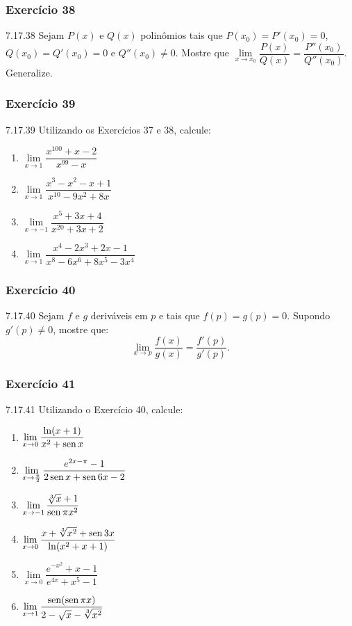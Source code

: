 \subsubsection*{Exercício 38}
\begin{exercicio}[38]{7.17.38}
Sejam $P(x)$ e $Q(x)$ polinômios tais que $P(x_0) = P'(x_0) = 0$, $Q(x_0) = Q'(x_0) = 0$ e $Q''(x_0) \neq 0$. Mostre que $\lim\limits_{x \to x_0} \dfrac{P(x)}{Q(x)} = \dfrac{P''(x_0)}{Q''(x_0)}$. Generalize.
\end{exercicio}

\subsubsection*{Exercício 39}
\begin{exercicio}[39]{7.17.39}
Utilizando os Exercícios 37 e 38, calcule:
\begin{enumerate}[label=\alph*)]
    \item $\lim\limits_{x \to 1} \dfrac{x^{100} + x - 2}{x^{99} - x}$
    \item $\lim\limits_{x \to 1} \dfrac{x^3 - x^2 - x + 1}{x^{10} - 9x^2 + 8x}$
    \item $\lim\limits_{x \to -1} \dfrac{x^5 + 3x + 4}{x^{20} + 3x + 2}$
    \item $\lim\limits_{x \to 1} \dfrac{x^4 - 2x^3 + 2x - 1}{x^8 - 6x^6 + 8x^5 - 3x^4}$
\end{enumerate}
\end{exercicio}

\subsubsection*{Exercício 40}
\begin{exercicio}[40]{7.17.40}
Sejam $f$ e $g$ deriváveis em $p$ e tais que $f(p) = g(p) = 0$. Supondo $g'(p) \neq 0$, mostre que:
\[
\lim_{x \to p} \dfrac{f(x)}{g(x)} = \dfrac{f'(p)}{g'(p)}.
\]
\end{exercicio}

\subsubsection*{Exercício 41}
\begin{exercicio}[41]{7.17.41}
Utilizando o Exercício 40, calcule:
\begin{enumerate}[label=\alph*)]
    \item $\lim\limits_{x \to 0} \dfrac{\ln(x + 1)}{x^2 + \operatorname{sen} x}$
    \item $\lim\limits_{x \to \frac{\pi}{2}} \dfrac{e^{2x - \pi} - 1}{2\operatorname{sen} x + \operatorname{sen} 6x - 2}$
    \item $\lim\limits_{x \to -1} \dfrac{\sqrt[3]{x} + 1}{\operatorname{sen}\pi x^2}$
    \item $\lim\limits_{x \to 0} \dfrac{x + \sqrt[3]{x^2} + \operatorname{sen} 3x}{\ln(x^2 + x + 1)}$
    \item $\lim\limits_{x \to 0} \dfrac{e^{-x^2} + x - 1}{e^{4x} + x^5 - 1}$
    \item $\lim\limits_{x \to 1} \dfrac{\operatorname{sen}(\operatorname{sen}\pi x)}{2 - \sqrt{x} - \sqrt[3]{x^2}}$
\end{enumerate}
\end{exercicio}

